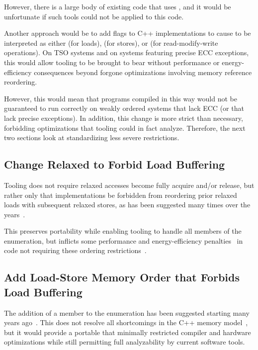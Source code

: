 \documentclass[10]{article}
\begin{document}
However, there is a large body of existing code that uses
, and it would be unfortunate if such tools
could not be applied to this code.

Another approach would be to add flags to C++ implementations
to cause  to be interpreted as either
 (for loads),  (for
stores), or  (for read-modify-write operations).
On TSO systems and on systems featuring precise ECC exceptions, this
would allow tooling to be brought to bear without performance or
energy-efficiency consequences beyond forgone optimizations involving
memory reference reordering.

However, this would mean that programs compiled in this way would not
be guaranteed to run correctly on weakly ordered systems that lack
ECC (or that lack precise exceptions).
In addition, this change is more strict than necessary, forbidding
optimizations that tooling could in fact analyze.
Therefore, the next two sections look at standardizing less severe
restrictions.

\subsection{Change Relaxed to Forbid Load Buffering}
\label{sec:Change Relaxed to Forbid Load Buffering}

Tooling does not require relaxed accesses become fully acquire and/or
release, but rather only that implementations be forbidden from reordering
prior relaxed loads with subsequent relaxed stores, as has been suggested
many times over the
years~\cite{Boehm:2014:OGA:2618128.2618134,HansBoehm2019OOTArevisitedAgain,Lahav:2017:RSC:3062341.3062352}.

This preserves portability while enabling tooling to handle all members
of the  enumeration, but inflicts some performance and
energy-efficiency penalties~\cite{LukeGeeson2023TightenRelaxed} in
code not requiring these ordering
restrictions~\cite{PaulEMcKenney2020RelaxedGuideRelaxed}.

\subsection{Add Load-Store Memory Order that Forbids Load Buffering}
\label{sec:Add Load-Store Memory Order that Forbids Load Buffering}

The addition of a  member to the
 enumeration has been suggested starting many years
ago~\cite{HansBoehm2019OOTArevisitedAgain,DanielLustig2018PlacedBefore}.
This does not resolve all shortcomings in the C++ memory
model~\cite{PaulEMcKenney2023P0124R8-LKMM,DanielLustig2018PlacedBefore},
but it would provide a portable  that minimally
restricted compiler and hardware optimizations while still permitting
full analyzability by current software tools.
\end{document}
